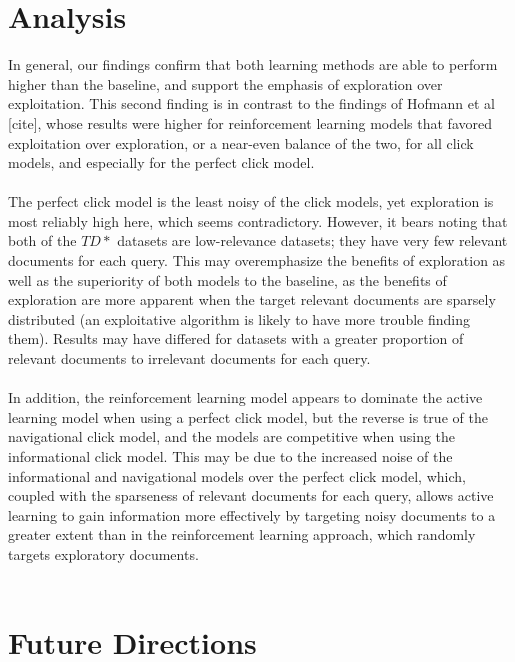 \documentclass{acm_proc_article-sp}
\begin{document}
\section{Analysis}
In general, our findings confirm that both learning methods are able to perform higher than the baseline, and support the emphasis of exploration over exploitation.  This second finding is in contrast to the findings of Hofmann et al [cite], whose results were higher for reinforcement learning models that favored exploitation over exploration, or a near-even balance of the two, for all click models, and especially for the perfect click model. \\ \\
The perfect click model is the least noisy of the click models, yet exploration is most reliably high here, which seems contradictory.  However, it bears noting that both of the $TD*$ datasets are low-relevance datasets; they have very few relevant documents for each query.  This may overemphasize the benefits of exploration as well as the superiority of both models to the baseline, as the benefits of exploration are more apparent when the target relevant documents are sparsely distributed (an exploitative algorithm is likely to have more trouble finding them).  Results may have differed for datasets with a greater proportion of relevant documents to irrelevant documents for each query.  \\ \\
In addition, the reinforcement learning model appears to dominate the active learning model when using a perfect click model, but the reverse is true of the navigational click model, and the models are competitive when using the informational click model.  This may be due to the increased noise of the informational and navigational models over the perfect click model, which, coupled with the sparseness of relevant documents for each query, allows active learning to gain information more effectively by targeting noisy documents to a greater extent than in the reinforcement learning approach, which randomly targets exploratory documents.   \\ \\

\section{Future Directions}
\end{document}
